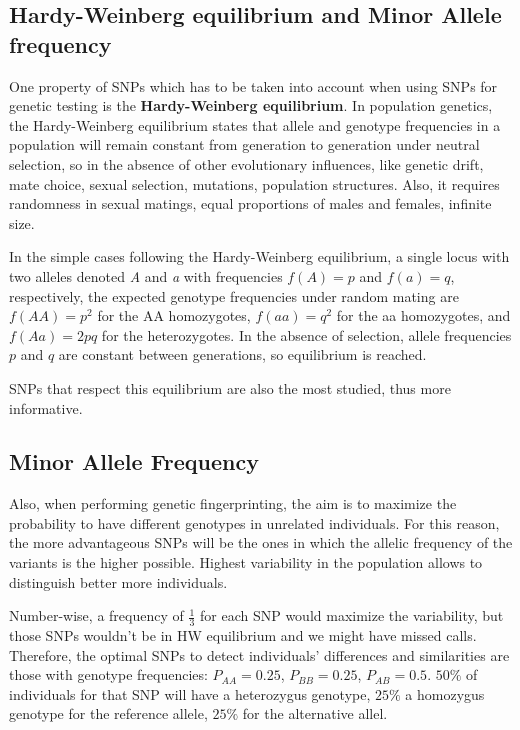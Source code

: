 \subsection{Hardy-Weinberg equilibrium and Minor Allele frequency}

One property of SNPs which has to be taken into account when using SNPs for
genetic testing is the \textbf{Hardy-Weinberg equilibrium}. In population
genetics, the Hardy-Weinberg equilibrium states that allele and genotype
frequencies in a population will remain constant from generation to generation
under neutral selection, so in the absence of other evolutionary influences,
like genetic drift, mate choice, sexual selection, mutations, population
structures. Also, it requires randomness in sexual matings, equal proportions of
males and females, infinite size.

In the simple cases following the Hardy-Weinberg equilibrium, a single locus
with two alleles denoted \emph{A} and \emph{a} with frequencies $f(A) = p$ and
$f(a) = q$, respectively, the expected genotype frequencies under random mating
are $f(AA) = p^{2}$ for the AA homozygotes, $f(aa) = q^{2}$ for the aa
homozygotes, and $f(Aa) = 2pq$ for the heterozygotes. In the absence of
selection, allele frequencies $p$ and $q$ are constant between generations, so
equilibrium is reached. 

SNPs that respect this equilibrium are also the most studied, thus more
informative. 

\subsection{Minor Allele Frequency}

Also, when performing genetic fingerprinting, the aim is to maximize the
probability to have different genotypes in unrelated individuals. For this
reason, the more advantageous SNPs will be the ones in which the allelic
frequency of the variants is the higher possible. Highest variability in the
population allows to distinguish better more individuals. 

Number-wise, a frequency of $\frac{1}{3}$ for each SNP would maximize the
variability, but those SNPs wouldn't be in HW equilibrium and we might have
missed calls. Therefore, the optimal SNPs to detect individuals’ differences and
similarities are those with genotype frequencies: $P_{AA} = 0.25$, $P_{BB} =
0.25$, $P_{AB} = 0.5$. $50\%$ of individuals for that SNP will have a
heterozygus genotype, $25\%$ a homozygus genotype for the reference allele,
$25\%$ for the alternative allel.

